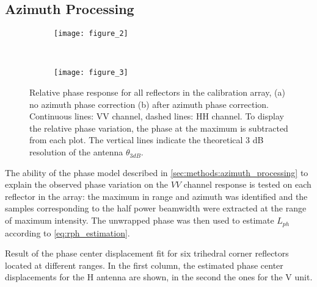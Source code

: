 \subsection{Azimuth Processing}\label{sec:results:azimuth_processing}
\begin{figure}[Ht!]
	\centering
	\begin{subfigure}[t]{\columnwidth}
		\centering
		\texttt{[image: figure\_2]}
		\subcaption{}
		\label{fig:phase_response_VV:uncorrected}
	\end{subfigure}\\
	\begin{subfigure}[t]{\columnwidth}
		\centering
		\texttt{[image: figure\_3]}
		\subcaption{}
		\label{fig:phase_response_VV:corrected}
	\end{subfigure}
	\caption{Relative phase response for all reflectors in the calibration array, (a) no azimuth phase correction (b) after azimuth phase correction. Continuous lines: VV channel, dashed lines: HH channel. To display the relative phase variation, the phase at the maximum is subtracted from each plot. The vertical lines indicate the theoretical 3 dB resolution of the antenna $\theta_{3dB}$.}
	\label{fig:phase_response_VV}
\end{figure}
The ability of the phase model described in \autoref{sec:methods:azimuth_processing} to explain the observed phase variation  on the $VV$ channel response is tested on each reflector in the array: the maximum in range and azimuth was identified and the samples corresponding to the half power beamwidth were extracted at the range of maximum intensity. The unwrapped phase was then used to estimate $L_{ph}$ according to \eqref{eq:rph_estimation}.
\begin{table}[Ht!]
	\centering
	\caption{Result of the phase center displacement fit for six trihedral corner reflectors located at different ranges. In the first column, the estimated phase center displacements for the H antenna are shown, in the second the ones for the V unit.}
	\label{tab:rph_fit}
\end{table}
